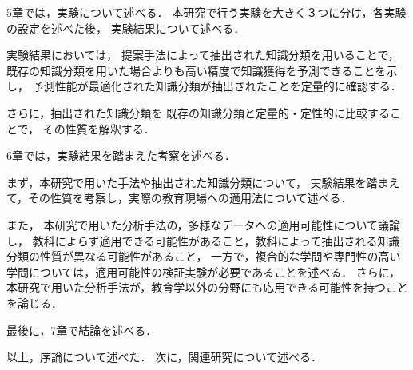 5章では，実験について述べる．
本研究で行う実験を大きく３つに分け，各実験の設定を述べた後，
実験結果について述べる．

実験結果においては，
提案手法によって抽出された知識分類を用いることで，既存の知識分類を用いた場合よりも高い精度で知識獲得を予測できることを示し，
予測性能が最適化された知識分類が抽出されたことを定量的に確認する．

さらに，抽出された知識分類を
既存の知識分類と定量的・定性的に比較することで，
その性質を解釈する．


6章では，実験結果を踏まえた考察を述べる．

まず，本研究で用いた手法や抽出された知識分類について，
実験結果を踏まえて，その性質を考察し，実際の教育現場への適用法について述べる．

また，
本研究で用いた分析手法の，多様なデータへの適用可能性について議論し，
教科によらず適用できる可能性があること，教科によって抽出される知識分類の性質が異なる可能性があること，
一方で，複合的な学問や専門性の高い学問については，適用可能性の検証実験が必要であることを述べる．
さらに，本研究で用いた分析手法が，教育学以外の分野にも応用できる可能性を持つことを論じる．


最後に，7章で結論を述べる．



\vvspace
以上，序論について述べた．
次に，関連研究について述べる．


